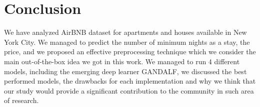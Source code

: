 \documentclass[a4paper,12pt]{article}
\begin{document}
\section*{Conclusion}
We have analyzed AirBNB dataset for apartments and houses available in New York City. We managed to predict the number of minimum nights as a stay, the price, and we proposed an effective preprocessing technique which we consider the main out-of-the-box idea we got in this work. We managed to run 4 different models, including the emerging deep learner GANDALF, we discussed the best performed models, the drawbacks for each implementation and why we think that our study would provide a significant contribution to the community in such area of research.


























\newpage
\sloppy
\end{document}
